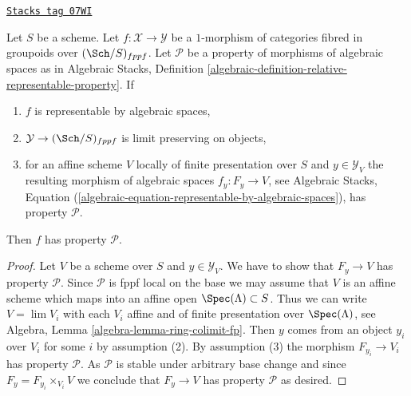\begin{lemma}
\label{criteria-lemma-check-property-limit-preserving}
\href{https://stacks.math.columbia.edu/tag/07WI}{\texttt{Stacks tag 07WI}}

Let $S$ be a scheme. Let $f : \mathcal{X} \to \mathcal{Y}$ be a $1$-morphism
of categories fibred in groupoids over $(\Sch/S)_{fppf}$. Let $\mathcal{P}$
be a property of morphisms of algebraic spaces as in
Algebraic Stacks, Definition
\ref{algebraic-definition-relative-representable-property}. If
\begin{enumerate}
\item $f$ is representable by algebraic spaces,
\item $\mathcal{Y} \to (\Sch/S)_{fppf}$ is limit preserving on objects,
\item for an affine scheme $V$ locally of finite presentation over $S$ and
$y \in \mathcal{Y}_V$ the resulting morphism of algebraic spaces
$f_y : F_y \to V$, see Algebraic Stacks, Equation
(\ref{algebraic-equation-representable-by-algebraic-spaces}),
has property $\mathcal{P}$.
\end{enumerate}
Then $f$ has property $\mathcal{P}$.
\end{lemma}

\begin{proof}
Let $V$ be a scheme over $S$ and $y \in \mathcal{Y}_V$. We have to show
that $F_y \to V$ has property $\mathcal{P}$. Since $\mathcal{P}$ is
fppf local on the base we may assume that $V$ is an affine scheme which
maps into an affine open $\Spec(\Lambda) \subset S$. Thus we can write
$V = \lim V_i$ with each $V_i$ affine and of finite presentation over
$\Spec(\Lambda)$, see Algebra, Lemma \ref{algebra-lemma-ring-colimit-fp}.
Then $y$ comes from an object $y_i$ over $V_i$ for some $i$ by assumption (2).
By assumption (3) the morphism $F_{y_i} \to V_i$ has property $\mathcal{P}$.
As $\mathcal{P}$ is stable under arbitrary base change and since
$F_y = F_{y_i} \times_{V_i} V$ we conclude that $F_y \to V$ has property
$\mathcal{P}$ as desired.
\end{proof}

